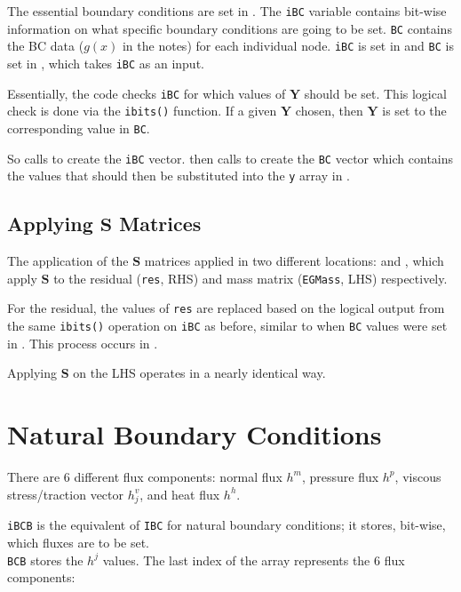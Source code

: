 \documentclass[12pt, letterpaper, twoside]{article}
\renewcommand{\vec}[1]{\bm{#1}}
\newcommand{\ttt}[1]{\texttt{#1}}
\newcommand{\Y}{\vec{Y}}
\newcommand{\Sm}{\vec{S}}
\newcommand{\0}{\vec{0}}
\begin{document}
The essential boundary conditions are set in . The \ttt{iBC} variable contains bit-wise information on what specific boundary conditions are going to be set. \ttt{BC} contains the BC data (\(g(x)\) in the notes) for each individual node. 
\ttt{iBC} is set in  and \ttt{BC} is set in , which takes \ttt{iBC} as an input. 

Essentially, the code checks \ttt{iBC} for which values of \(\Y\) should be set. This logical check is done via the \ttt{ibits()} function. If a given \(\Y\) chosen, then \(\Y\) is set to the corresponding value in \ttt{BC}.

So  calls  to create the \ttt{iBC} vector.  then calls  to create the \ttt{BC} vector which contains the values that should then be substituted into the \ttt{y} array in .


\subsection{Applying \(\vec{S}\) Matrices}
The application of the \(\Sm\) matrices applied in two different locations:  and , which apply \(\Sm\) to the residual (\ttt{res}, RHS) and mass matrix (\ttt{EGMass}, LHS) respectively. 

For the residual, the values of \ttt{res} are replaced based on the logical output from the same \ttt{ibits()} operation on \ttt{iBC} as before, similar to when \ttt{BC} values were set in . This process occurs in . 

Applying \(\Sm\) on the LHS operates in a nearly identical way. 

\section{Natural Boundary Conditions}

There are 6 different flux components: normal flux \(h^m\), pressure flux \(h^p\), viscous stress/traction vector \(h^v_j\), and heat flux \(h^h\).

\ttt{iBCB} is the equivalent of \ttt{IBC} for natural boundary conditions; it stores, bit-wise, which fluxes are to be set. \\
\ttt{BCB} stores the \(h^j\) values. The last index of the array represents the 6 flux components:
\end{document}
